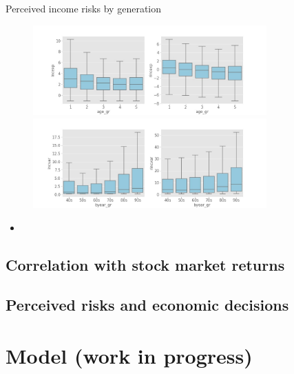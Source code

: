 \documentclass{beamer}
\begin{document}
\begin{frame}{Perceived income risks by generation}
	\begin{figure}
		\centering
		\label{boxplot_byear_gr}
		\includegraphics[width=0.8\textwidth]{figures/boxplot_exp_byear_gr} \\
		\includegraphics[width=0.8\textwidth]{figures/boxplot_var_byear_gr}
	\end{figure}
	\begin{itemize}
		\item 
	\end{itemize}
\end{frame}




\subsection{Correlation with stock market returns}

\subsection{Perceived risks and economic decisions}

\section{Model (work in progress)}
\end{document}

